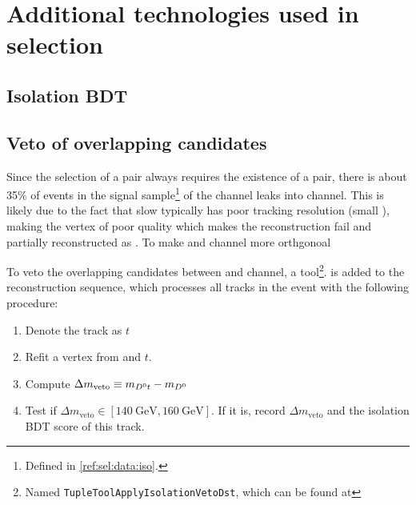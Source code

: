 \section{Additional technologies used in selection}
\label{ref:sel:tech}


\subsection{Isolation BDT}
\label{ref:sel:tech:iso-bdt}


\subsection{Veto of overlapping candidates}
\label{ref:sel:tech:veto}

Since the selection of a \Dstar\muon pair always requires the existence
of a \Dz\muon pair,
there is about 35\% of events in the signal sample\footnote{
    Defined in \cref{ref:sel:data:iso}.
} of the \Dstar channel leaks into \Dz channel.
This is likely due to the fact that slow \pion typically has poor tracking
resolution (small \ipChiSq), making the \Dz\pion vertex of poor quality which
makes the reconstruction fail and \Dstar partially reconstructed as \Dz.
To make \Dstar and \Dz channel more orthgonoal

To veto the overlapping candidates between \Dz and \Dstar channel,
a tool\footnote{
    Named \texttt{TupleToolApplyIsolationVetoDst}, which can be found at
}.
is added to the \davinci reconstruction sequence, which processes all tracks
in the event with the following procedure:

\begin{enumerate}
    \item Denote the track as $t$
    \item Refit a vertex from \Dz and $t$.
    \item Compute $\Delta m_\text{veto} \equiv m_{{{D}^0} t} - m_{{D}^0}$
    \item Test if $\Delta m_\text{veto} \in [140~\text{GeV}, 160~\text{GeV}]$.
        If it is, record $\Delta m_\text{veto}$ and the isolation BDT
        score of this track.
\end{enumerate}

